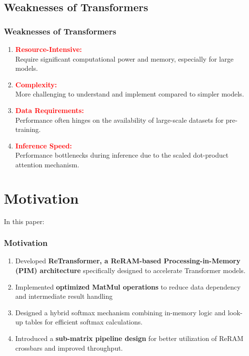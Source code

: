 \documentclass[
	12pt, %
]{beamer}
\begin{document}
\subsection{Weaknesses of Transformers}
\begin{frame}
	\frametitle{Weaknesses of Transformers}
	
	\begin{enumerate}
		\item
		\textbf{\textcolor{Red}{Resource-Intensive:}}\\ Require significant computational power and memory, especially for large models.
		
		\item
		\textbf{\textcolor{Red}{Complexity:}}\\ More challenging to understand and implement compared to simpler models.
		
		\item 
		\textbf{\textcolor{Red}{Data Requirements:}}\\ Performance often hinges on the availability of large-scale datasets for pre-training.
		
		\item 
		\textbf{\textcolor{Red}{Inference Speed:}}\\ Performance bottlenecks during inference due to the scaled dot-product attention mechanism.
	\end{enumerate}
\end{frame}







\section{Motivation}
\begin{frame}
	
	In this paper:
	\frametitle{Motivation}
	
	\begin{enumerate}
		\item
		Developed \textbf{ReTransformer, a ReRAM-based Processing-in-Memory (PIM) architecture} specifically designed to accelerate Transformer models.
		
		\item 
		Implemented \textbf{optimized MatMul operations} to reduce data dependency and intermediate result handling
		
		\item 
		Designed a hybrid softmax mechanism combining in-memory logic and look-up tables for efficient softmax calculations.
		
		\item 
		Introduced a \textbf{sub-matrix pipeline design} for better utilization of ReRAM crossbars and improved throughput.
	\end{enumerate}
\end{frame}
\end{document}
